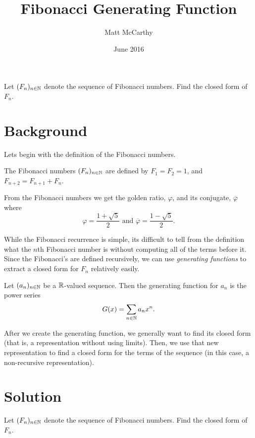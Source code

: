 \documentclass[notitlepage]{problem-solving}
\author{Matt McCarthy}
\title{Fibonacci Generating Function}
\date{June 2016}
\begin{document}
\maketitle

\begin{problem*}
	Let $(F_n)_{n\in\mathbb{N}}$ denote the sequence of Fibonacci numbers.
	Find the closed form of $F_n$.
\end{problem*}

\section{Background}

Lets begin with the definition of the Fibonacci numbers.
\begin{definition}
	The Fibonacci numbers $(F_n)_{n\in\mathbb{N}}$ are defined by $F_1=F_2=1$, and $F_{n+2}=F_{n+1}+F_n$.
\end{definition}

From the Fibonacci numbers we get the golden ratio, $\varphi$, and its conjugate, $\overline{\varphi}$ where
\[
	\varphi = \frac{1+\sqrt{5}}{2} \text{ and } \overline{\varphi} = \frac{1-\sqrt{5}}{2}.
\]

While the Fibonacci recurrence is simple, its difficult to tell from the definition what the $n$th Fibonacci number is without computing all of the terms before it.
Since the Fibonacci's are defined recursively, we can use \textit{generating functions} to extract a closed form for $F_n$ relatively easily.

\begin{definition}
	Let $(a_n)_{n\in\mathbb{N}}$ be a $\mathbb{R}$-valued sequence.
	Then the generating function for $a_n$ is the power series
	\[
		G(x) = \sum_{n\in\mathbb{N}} a_nx^n.
	\]
\end{definition}

After we create the generating function, we generally want to find its closed form (that is, a representation without using limits).
Then, we use that new representation to find a closed form for the terms of the sequence (in this case, a non-recursive representation).

\section{Solution}

\begin{problem*}
	Let $(F_n)_{n\in\mathbb{N}}$ denote the sequence of Fibonacci numbers.
	Find the closed form of $F_n$.
\end{problem*}
\end{document}
